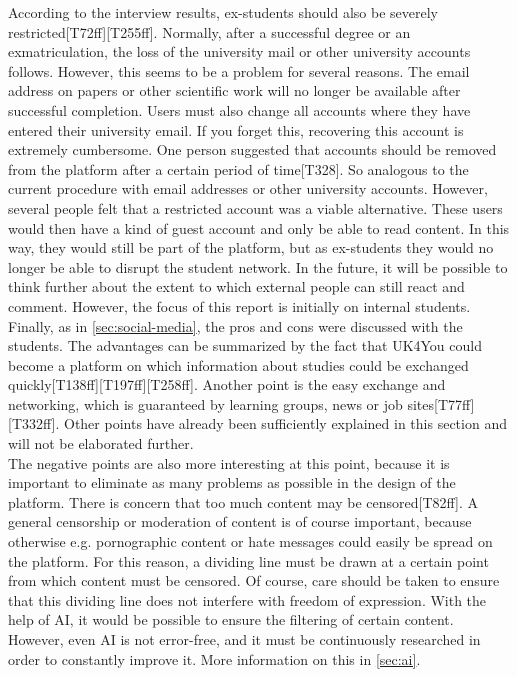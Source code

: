 According to the interview results, ex-students should also be severely restricted[T72ff][T255ff].
Normally, after a successful degree or an exmatriculation, the loss of the university mail or other university accounts follows.
However, this seems to be a problem for several reasons.
The email address on papers or other scientific work will no longer be available after successful completion.
Users must also change all accounts where they have entered their university email.
If you forget this, recovering this account is extremely cumbersome.
One person suggested that accounts should be removed from the platform after a certain period of time[T328].
So analogous to the current procedure with email addresses or other university accounts.
However, several people felt that a restricted account was a viable alternative.
These users would then have a kind of guest account and only be able to read content.
In this way, they would still be part of the platform, but as ex-students they would no longer be able to disrupt the student network.
In the future, it will be possible to think further about the extent to which external people can still react and comment.
However, the focus of this report is initially on internal students.\\

Finally, as in \autoref{sec:social-media}, the pros and cons were discussed with the students.
The advantages can be summarized by the fact that UK4You could become a platform on which information about studies could be exchanged quickly[T138ff][T197ff][T258ff].
Another point is the easy exchange and networking, which is guaranteed by learning groups, news or job sites[T77ff][T332ff].
Other points have already been sufficiently explained in this section and will not be elaborated further.\\

The negative points are also more interesting at this point, because it is important to eliminate as many problems as possible in the design of the platform.
There is concern that too much content may be censored[T82ff].
A general censorship or moderation of content is of course important, because otherwise e.g. pornographic content or hate messages could easily be spread on the platform.
For this reason, a dividing line must be drawn at a certain point from which content must be censored.
Of course, care should be taken to ensure that this dividing line does not interfere with freedom of expression.
With the help of AI, it would be possible to ensure the filtering of certain content.
However, even AI is not error-free, and it must be continuously researched in order to constantly improve it.
More information on this in \autoref{sec:ai}.\\


